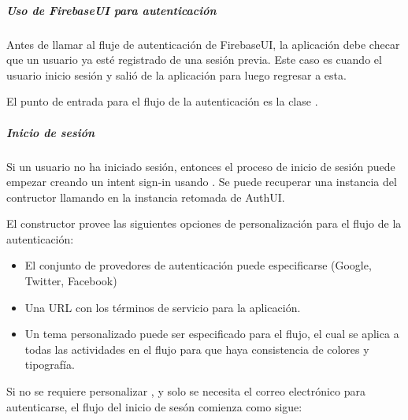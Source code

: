 \subparagraph{Uso de FirebaseUI para autenticación}
\label{\detokenize{dev_docs:uso-de-firebaseui-para-autenticacion}}
Antes de llamar al fluje de autenticación de FirebaseUI, la aplicación debe
checar que un usuario ya esté registrado de una sesión previa. Este caso
es cuando el usuario inicio sesión y salió de la aplicación para luego regresar
a esta.

%
\begin{sphinxVerbatim}[commandchars=\\\{\}]
   
    
  
\end{sphinxVerbatim}

El punto de entrada para el flujo de la autenticación es la clase
.


\subparagraph{Inicio de sesión}
\label{\detokenize{dev_docs:inicio-de-sesion}}
Si un usuario no ha iniciado sesión, entonces el proceso de inicio de sesión
puede empezar creando un intent sign-in usando .
Se puede recuperar una instancia del contructor llamando
 en la instancia retomada de AuthUI.

El constructor provee las siguientes opciones de personalización para el flujo
de la autenticación:
\begin{itemize}
\item {} 
El conjunto de provedores de autenticación puede especificarse (Google, Twitter, Facebook)

\item {} 
Una URL con los términos de servicio para la aplicación.

\item {} 
Un tema personalizado puede ser especificado para el flujo, el cual se aplica a todas las actividades en el flujo para que haya consistencia de colores y tipografía.

\end{itemize}

Si no se requiere personalizar , y solo se necesita el correo electrónico para
autenticarse, el flujo del inicio de sesón comienza como sigue:

